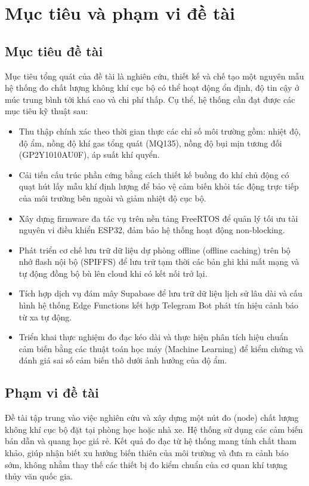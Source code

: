 \section{Mục tiêu và phạm vi đề tài}
\subsection{Mục tiêu đề tài}
Mục tiêu tổng quát của đề tài là nghiên cứu, thiết kế và chế tạo một nguyên mẫu hệ thống đo chất lượng không khí cục bộ có thể hoạt động ổn định, độ tin cậy ở múc trung bình tới khá cao và chi phí thấp. Cụ thể, hệ thống cần đạt được các mục tiêu kỹ thuật sau:
\begin{itemize}
    \item Thu thập chính xác theo thời gian thực các chỉ số môi trường gồm: nhiệt độ, độ ẩm, nồng độ khí gas tổng quát (MQ135), nồng độ bụi mịn tương đối (GP2Y1010AU0F), áp suất khí quyển.
    \item Cải tiến cấu trúc phần cứng bằng cách thiết kế buồng đo khí chủ động có quạt hút lấy mẫu khí định lượng để bảo vệ cảm biến khỏi tác động trực tiếp của môi trường bên ngoài và giảm nhiệt độ cục bộ.
    \item Xây dựng firmware đa tác vụ trên nền tảng FreeRTOS để quản lý tối ưu tài nguyên vi điều khiển ESP32, đảm bảo hệ thống hoạt động non-blocking.
    \item Phát triển cơ chế lưu trữ dữ liệu dự phòng offline (offline caching) trên bộ nhớ flash nội bộ (SPIFFS) để lưu trữ tạm thời các bản ghi khi mất mạng và tự động đồng bộ bù lên cloud khi có kết nối trở lại.
    \item Tích hợp dịch vụ đám mây Supabase để lưu trữ dữ liệu lịch sử lâu dài và cấu hình hệ thống Edge Functions kết hợp Telegram Bot phát tín hiệu cảnh báo từ xa tự động.
    \item Triển khai thực nghiệm đo đạc kéo dài và thực hiện phân tích hiệu chuẩn cảm biến bằng các thuật toán học máy (Machine Learning) để kiểm chứng và đánh giá sai số cảm biến thô dưới ảnh hưởng của độ ẩm.
\end{itemize}

\subsection{Phạm vi đề tài}
Đề tài tập trung vào việc nghiên cứu và xây dựng một nút đo (node) chất lượng không khí cục bộ đặt tại phòng học hoặc nhà xe. Hệ thống sử dụng các cảm biến bán dẫn và quang học giá rẻ. Kết quả đo đạc từ hệ thống mang tính chất tham khảo, giúp nhận biết xu hướng biến thiên của môi trường và đưa ra cảnh báo sớm, không nhằm thay thế các thiết bị đo kiểm chuẩn của cơ quan khí tượng thủy văn quốc gia.

